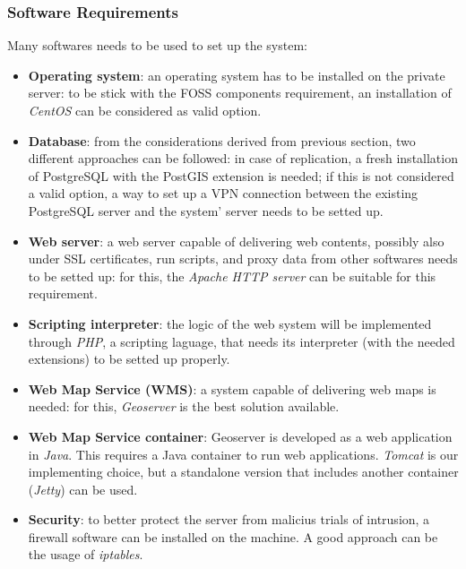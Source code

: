 \subsubsection{Software Requirements}
Many softwares needs to be used to set up the system:
\begin{itemize}
    \item \textbf{Operating system}: an operating system has to be installed on the private server: to be stick with the FOSS components requirement, an installation of \textit{CentOS} can be considered as valid option.
    \item \textbf{Database}: from the considerations derived from previous section, two different approaches can be followed: in case of replication, a fresh installation of PostgreSQL with the PostGIS extension is needed; if this is not considered a valid option, a way to set up a VPN connection between the existing PostgreSQL server and the system' server needs to be setted up.
    \item \textbf{Web server}: a web server capable of delivering web contents, possibly also under SSL certificates, run scripts, and proxy data from other softwares needs to be setted up: for this, the \textit{Apache HTTP server} can be suitable for this requirement.
    \item \textbf{Scripting interpreter}: the logic of the web system will be implemented through \textit{PHP}, a scripting laguage, that needs its interpreter (with the needed extensions) to be setted up properly.
    \item \textbf{Web Map Service (WMS)}: a system capable of delivering web maps is needed: for this, \textit{Geoserver} is the best solution available.
    \item \textbf{Web Map Service container}: Geoserver is developed as a web application in \textit{Java}. This requires a Java container to run web applications. \textit{Tomcat} is our implementing choice, but a standalone version that includes another container (\textit{Jetty}) can be used.
    \item \textbf{Security}: to better protect the server from malicius trials of intrusion, a firewall software can be installed on the machine. A good approach can be the usage of \textit{iptables}. 
\end{itemize}

